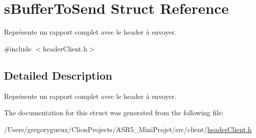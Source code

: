 \hypertarget{structs_buffer_to_send}{}\section{s\+Buffer\+To\+Send Struct Reference}
\label{structs_buffer_to_send}


Représente un rapport complet avec le header à envoyer.  




{\ttfamily \#include $<$header\+Client.\+h$>$}



\subsection{Detailed Description}
Représente un rapport complet avec le header à envoyer. 

The documentation for this struct was generated from the following file\+:\begin{DoxyCompactItemize}
\item 
/\+Users/gregorygueux/\+Clion\+Projects/\+A\+S\+R5\+\_\+\+Mini\+Projet/src/client/\hyperlink{header_client_8h}{header\+Client.\+h}\end{DoxyCompactItemize}
